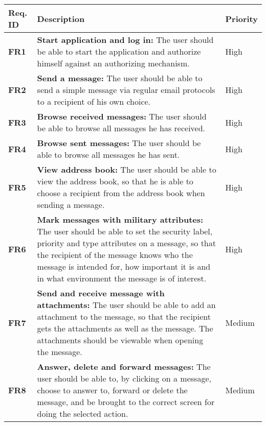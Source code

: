 
\begin{longtable}{>{\setlength\hsize{.3\hsize}}X|>{\setlength\hsize{0.9\hsize}}X|>{\setlength\hsize{.3\hsize}}X}\hline
\textbf{Req. ID} & \textbf{Description} & \textbf{Priority} \\ \hline \hline

\textbf{FR1} & \textbf{Start application and log in:} The user should be able to start the application and authorize himself against an authorizing mechanism. & High \\ \hline

\textbf{FR2} & \textbf{Send a message:} The user should be able to send a simple message via regular email protocols to a recipient of his own choice. & High \\ \hline

\textbf{FR3} & \textbf{Browse received messages:} The user should be able to browse all messages he has received. & High \\ \hline

\textbf{FR4} & \textbf{Browse sent messages:} The user should be able to browse all messages he has sent.& High \\ \hline

\textbf{FR5} & \textbf{View address book:} The user should be able to view the address book, so that he is able to choose a recipient from the address book when sending a message. & High \\ \hline

\textbf{FR6} & \textbf{Mark messages with military attributes:} The user should be able to set the security label, priority and type attributes on a message, so that the recipient of the message knows who the message is intended for, how important it is and in what environment the message is of interest. & High \\ \hline

\textbf{FR7} & \textbf{Send and receive message with attachments:} The user should be able to add an attachment to the message, so that the recipient gets the attachments as well as the message. The attachments should be viewable when opening the message. & Medium \\ \hline

\textbf{FR8} & \textbf{Answer, delete and forward messages:} The user should be able to, by clicking on a message, choose to answer to, forward or delete the message, and be brought to the correct screen for doing the selected action. & Medium \\ \hline


\end{longtable}
